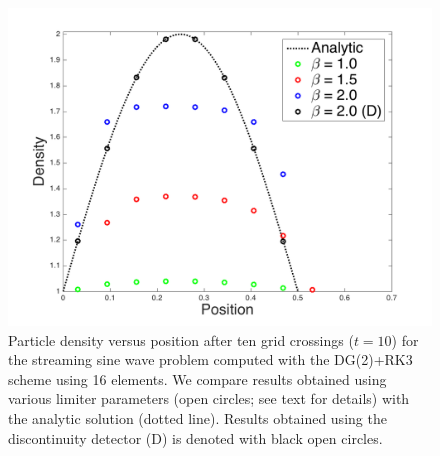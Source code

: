 \documentclass[11pt,letterpaper,twoside,english,final]{article}
\begin{document}
\begin{figure}[h]
  \centering
  \includegraphics[scale=0.78]{./Figures/StreamingSineWave1D}
  \vspace{-0.1in}
  \flushleft\caption[Particle density versus position after ten grid crossings ($t=10$) for the streaming sine wave problem computed with the DG(2)+RK3 scheme using 16 elements.]{Particle density versus position after ten grid crossings ($t=10$) for the streaming sine wave problem computed with the DG(2)+RK3 scheme using 16 elements.  \textmd{We compare results obtained using various limiter parameters (open circles; see text for details) with the analytic solution (dotted line).  Results obtained using the discontinuity detector (D) is denoted with black open circles.}}
  \label{fig:streamingSineWave}
\end{figure}
\end{document}
